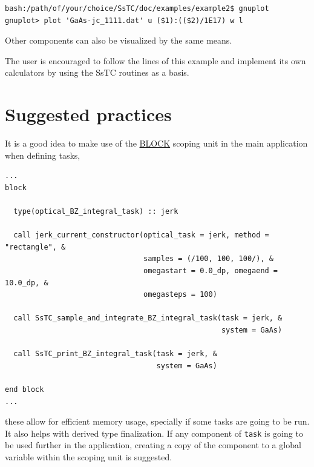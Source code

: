 \documentclass[10pt,a4paper]{article}
\begin{document}
\begin{codebox}{}
\begin{verbatim}
bash:/path/of/your/choice/SsTC/doc/examples/example2$ gnuplot
gnuplot> plot 'GaAs-jc_1111.dat' u ($1):(($2)/1E17) w l
\end{verbatim}
\end{codebox}
Other components can also be visualized by the same means.

The user is encouraged to follow the lines of this example and implement its own calculators by using the SsTC routines as a basis.
\section{Suggested practices}
It is a good idea to make use of the \href{https://www.intel.com/content/www/us/en/docs/fortran-compiler/developer-guide-reference/2023-0/block.html}{BLOCK} scoping unit in the main application when defining tasks,
\begin{codebox}{}
\begin{lstlisting}[caption={Definition of SsTC tasks in BLOCK scoping units.},captionpos=b]
...
block
  
  type(optical_BZ_integral_task) :: jerk

  call jerk_current_constructor(optical_task = jerk, method = "rectangle", &
                                samples = (/100, 100, 100/), &
                                omegastart = 0.0_dp, omegaend = 10.0_dp, &
                                omegasteps = 100)

  call SsTC_sample_and_integrate_BZ_integral_task(task = jerk, &
                                                  system = GaAs)

  call SsTC_print_BZ_integral_task(task = jerk, &
                                   system = GaAs)

end block
...
\end{lstlisting}
\end{codebox}
these allow for efficient memory usage, specially if some tasks are going to be run. It also helps with derived type finalization. If any component of \verb|task| is going to be used further in the application, creating a copy of the component to a global variable within the scoping unit is suggested.


\end{document}
